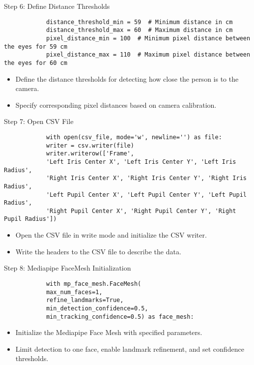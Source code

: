 \documentclass{beamer}
\begin{document}
	\begin{frame}[fragile]{Step 6: Define Distance Thresholds}
		\tiny
		\begin{verbatim}
			distance_threshold_min = 59  # Minimum distance in cm
			distance_threshold_max = 60  # Maximum distance in cm
			pixel_distance_min = 100  # Minimum pixel distance between the eyes for 59 cm
			pixel_distance_max = 110  # Maximum pixel distance between the eyes for 60 cm
		\end{verbatim}
		\begin{itemize}
			\item Define the distance thresholds for detecting how close the person is to the camera.
			\item Specify corresponding pixel distances based on camera calibration.
		\end{itemize}
	\end{frame}
	
	\begin{frame}[fragile]{Step 7: Open CSV File}
		\tiny
		\begin{verbatim}
			with open(csv_file, mode='w', newline='') as file:
			writer = csv.writer(file)
			writer.writerow(['Frame', 
			'Left Iris Center X', 'Left Iris Center Y', 'Left Iris Radius', 
			'Right Iris Center X', 'Right Iris Center Y', 'Right Iris Radius',
			'Left Pupil Center X', 'Left Pupil Center Y', 'Left Pupil Radius', 
			'Right Pupil Center X', 'Right Pupil Center Y', 'Right Pupil Radius'])
		\end{verbatim}
		\begin{itemize}
			\item Open the CSV file in write mode and initialize the CSV writer.
			\item Write the headers to the CSV file to describe the data.
		\end{itemize}
	\end{frame}
	
	\begin{frame}[fragile]{Step 8: Mediapipe FaceMesh Initialization}
		\tiny
		\begin{verbatim}
			with mp_face_mesh.FaceMesh(
			max_num_faces=1,
			refine_landmarks=True,
			min_detection_confidence=0.5,
			min_tracking_confidence=0.5) as face_mesh:
		\end{verbatim}
		\begin{itemize}
			\item Initialize the Mediapipe Face Mesh with specified parameters.
			\item Limit detection to one face, enable landmark refinement, and set confidence thresholds.
		\end{itemize}
	\end{frame}
	
\end{document}
